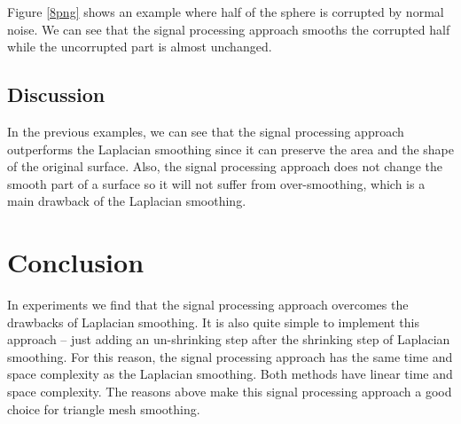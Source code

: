 \documentclass[conference]{IEEEtran}
\begin{document}
Figure \ref{8png} shows an example where half of the sphere is corrupted by normal noise. We can see that the signal processing approach smooths the corrupted half while the uncorrupted part is almost unchanged.

\subsection{Discussion}

In the previous examples, we can see that the signal processing approach outperforms the Laplacian smoothing since it can preserve the area and the shape of the original surface. Also, the signal processing approach does not change the smooth part of a surface so it will not suffer from over-smoothing, which is a main drawback of the Laplacian smoothing.

\section{Conclusion}

In experiments we find that the signal processing approach overcomes the drawbacks of Laplacian smoothing. It is also quite simple to implement this approach -- just adding an un-shrinking step after the shrinking step of Laplacian smoothing. For this reason, the signal processing approach has the same time and space complexity as the Laplacian smoothing. Both methods have linear time and space complexity. The reasons above make this signal processing approach a good choice for triangle mesh smoothing.
\end{document}
